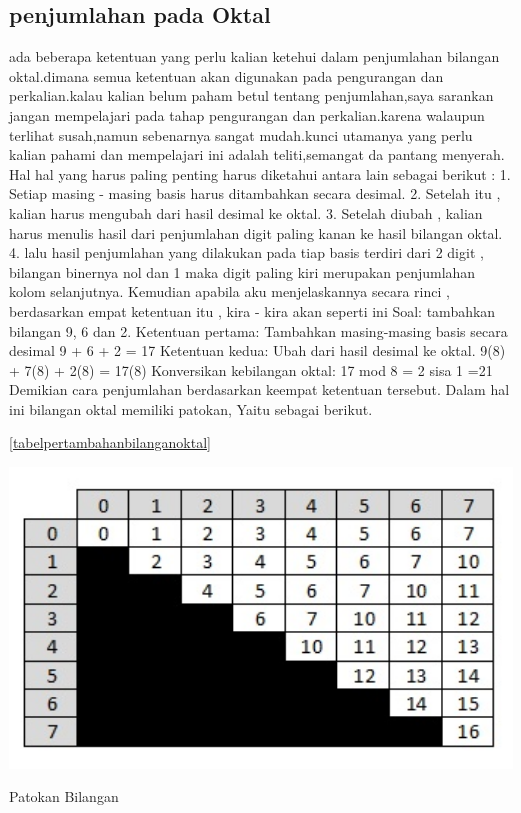  	\subsection{penjumlahan pada Oktal}
 ada beberapa ketentuan yang perlu kalian ketehui dalam penjumlahan bilangan oktal.dimana semua ketentuan akan digunakan pada pengurangan dan perkalian.kalau kalian belum paham betul tentang penjumlahan,saya sarankan jangan mempelajari pada tahap pengurangan dan perkalian.karena walaupun terlihat susah,namun sebenarnya sangat mudah.kunci utamanya yang perlu kalian pahami dan mempelajari ini adalah teliti,semangat da pantang menyerah.
 Hal hal yang harus paling penting harus diketahui antara lain sebagai berikut  :
1. Setiap masing - masing basis harus ditambahkan secara desimal.
2. Setelah itu , kalian harus  mengubah dari hasil desimal ke oktal.
3. Setelah diubah  , kalian harus menulis hasil dari penjumlahan digit paling kanan ke hasil bilangan oktal.
4. lalu hasil penjumlahan yang dilakukan pada tiap basis terdiri dari 2 digit , bilangan binernya nol dan 1 maka digit paling kiri merupakan  penjumlahan kolom selanjutnya.
Kemudian apabila aku menjelaskannya secara rinci , berdasarkan empat ketentuan itu , kira - kira akan seperti ini 
Soal: tambahkan bilangan 9, 6 dan 2.
Ketentuan pertama:
Tambahkan masing-masing basis secara desimal
9 + 6 + 2 = 17
Ketentuan kedua:
Ubah dari hasil desimal ke oktal.
9(8) + 7(8) + 2(8) = 17(8)
Konversikan kebilangan oktal:
17 mod 8 = 2 sisa 1
=21
Demikian cara penjumlahan berdasarkan keempat ketentuan tersebut.
Dalam hal ini bilangan oktal memiliki patokan, Yaitu sebagai berikut.

	\ref{tabelpertambahanbilanganoktal}
	\begin{figures}[ht]
	\centerline{\includegraphics[width=1\textwidth]{figures/tabelpertambahanbilanganoktal.JPG}}
	\caption{Patokan Bilangan}
	\label{tabelpertambahanbilanganoktal}
	\end{figures}

